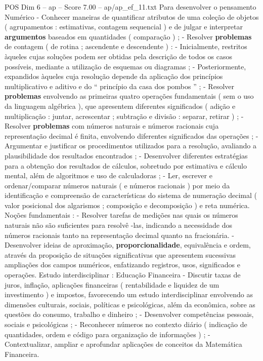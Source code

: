 \begin{textsample}{POS Dim 6 – ap – Score 7.00 – ap/ap\_ef\_11.txt}
Para desenvolver o pensamento Numérico - Conhecer maneiras de quantificar atributos de uma coleção de objetos ( agrupamentos : estimativas, contagem sequencial ) e de julgar e interpretar \textbf{argumentos} baseados em quantidades ( comparação ) ; - Resolver \textbf{problemas} de contagem ( de rotina ; ascendente e descendente ) : - Inicialmente, restritos àqueles cujas soluções podem ser obtidas pela descrição de todos os casos possíveis, mediante a utilização de esquemas ou diagramas ; - Posteriormente, expandidos àqueles cuja resolução depende da aplicação dos princípios multiplicativo e aditivo e do “ princípio da casa dos pombos ” ; - Resolver \textbf{problemas} envolvendo as primeiras quatro operações fundamentais ( sem o uso da linguagem algébrica ), que apresentem diferentes significados ( adição e multiplicação : juntar, acrescentar ; subtração e divisão : separar, retirar ) ; - Resolver \textbf{problemas} com números naturais e números racionais cuja representação decimal é finita, envolvendo diferentes significados das operações ; - Argumentar e justificar os procedimentos utilizados para a resolução, avaliando a plausibilidade dos resultados encontrados ; - Desenvolver diferentes estratégias para a obtenção dos resultados de cálculos, sobretudo por estimativa e cálculo mental, além de algoritmos e uso de calculadoras ; - Ler, escrever e ordenar/comparar números naturais ( e números racionais ) por meio da identificação e compreensão de características do sistema de numeração decimal ( valor posicional dos algarismos ; composição e decomposição ) e reta numérica.
Noções fundamentais : - Resolver tarefas de medições nas quais os números naturais não são suficientes para resolvê -las, indicando a necessidade dos números racionais tanto na representação decimal quanto na fracionária. - Desenvolver ideias de aproximação, \textbf{proporcionalidade}, equivalência e ordem, através da proposição de situações significativas que apresentem sucessivas ampliações dos campos numéricos, enfatizando registros, usos, significados e operações.
Estudo interdisciplinar : Educação Financeira - Discutir taxas de juros, inflação, aplicações financeiras ( rentabilidade e liquidez de um investimento ) e impostos, favorecendo um estudo interdisciplinar envolvendo as dimensões culturais, sociais, políticas e psicológicas, além da econômica, sobre as questões do consumo, trabalho e dinheiro ; - Desenvolver competências pessoais, sociais e psicológicas ; - Reconhecer números no contexto diário ( indicação de quantidades, ordem e código para organização de informações ) ; - Contextualizar, ampliar e aprofundar aplicações de conceitos da Matemática Financeira.

\end{textsample}
